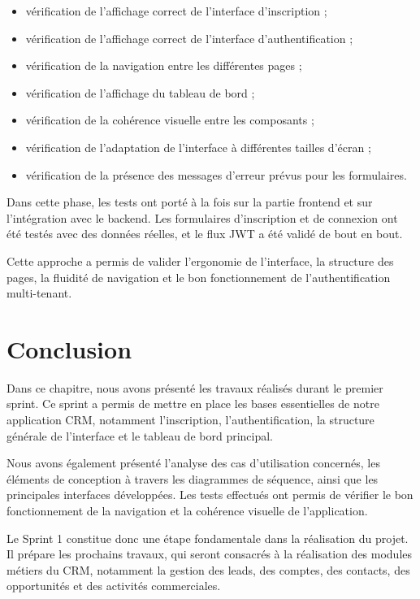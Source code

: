 \documentclass[12pt,a4paper,twoside,openany]{book}
\begin{document}
\begin{itemize}
    \item vérification de l’affichage correct de l’interface d’inscription ;
    \item vérification de l’affichage correct de l’interface d’authentification ;
    \item vérification de la navigation entre les différentes pages ;
    \item vérification de l’affichage du tableau de bord ;
    \item vérification de la cohérence visuelle entre les composants ;
    \item vérification de l’adaptation de l’interface à différentes tailles d’écran ;
    \item vérification de la présence des messages d’erreur prévus pour les formulaires.
\end{itemize}

Dans cette phase, les tests ont porté à la fois sur la partie frontend et sur l’intégration avec le backend. Les formulaires d’inscription et de connexion ont été testés avec des données réelles, et le flux JWT a été validé de bout en bout.

Cette approche a permis de valider l’ergonomie de l’interface, la structure des pages, la fluidité de navigation et le bon fonctionnement de l’authentification multi-tenant.

\section*{Conclusion}

Dans ce chapitre, nous avons présenté les travaux réalisés durant le premier sprint. Ce sprint a permis de mettre en place les bases essentielles de notre application CRM, notamment l’inscription, l’authentification, la structure générale de l’interface et le tableau de bord principal.

Nous avons également présenté l’analyse des cas d’utilisation concernés, les éléments de conception à travers les diagrammes de séquence, ainsi que les principales interfaces développées. Les tests effectués ont permis de vérifier le bon fonctionnement de la navigation et la cohérence visuelle de l’application.

Le Sprint 1 constitue donc une étape fondamentale dans la réalisation du projet. Il prépare les prochains travaux, qui seront consacrés à la réalisation des modules métiers du CRM, notamment la gestion des leads, des comptes, des contacts, des opportunités et des activités commerciales.
\end{document}
